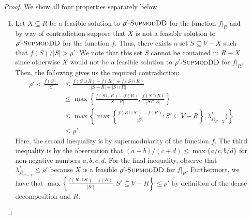 \documentclass{article}
\newcommand{\sdds}{\ensuremath{\textsc{SupmodDD}}\xspace}
\newcommand{\rhosdds}[1]{\ensuremath{#1\text{-}\sdds}}
\begin{document}
\begin{proof}
    We show all four properties separately below.
    \begin{enumerate}
        \item 
    Let $X \subseteq R$ be a feasible solution to \rhosdds{\rho'} for the function $f|_{R}$ and by way of contradiction suppose that $X$ is not a feasible solution to \rhosdds{\rho'} for the function $f$. Thus, there exists a set $S \subseteq V - X$ such that $f(S)/|S| > \rho'$. We note that this set $S$ cannot be contained in $R - X$ since otherwise $X$ would not be a feasible solution to \rhosdds{\rho'} for $f|_{R}$. Then, the following gives us the required contradiction:
    \begin{align*}
        \rho' < \frac{f(S)}{|S|}  & \leq \frac{f(S\cup R) - f(R) + f(S\cap R)}{|S - R| + |S\cap R|}\\
        & \leq \max\left\{\frac{f(S\cup R) - f(R)}{|S - R|}, \frac{f(S\cap R)}{|S\cap R|}\right\}\\
        &\leq \max\left\{\max\left\{\frac{f(R\cup S') - f(R)}{|S'|} : S'\subseteq V - R\right\}, 
        \lambda_{f|_{R - X}}^*
)\right\}\\
        & \leq \rho'.
    \end{align*}
    Here, the second inequality is by supermodularity of the function $f$. The third inequality is by the observation that $(a+b)/(c+d) \leq \max\{a/c, b/d\}$ for non-negative numbers $a,b,c,d$. For the final inequality, observe that 
    $\lambda_{f|_{R - X}}^* \leq \rho'$
    because $X$ is a feasible \rhosdds{\rho'} for $f|_{R}$. Furthermore, we have that $\max\left\{\frac{f(R\cup S') - f(R)}{|S'|} : S'\subseteq V - R\right\} \leq \rho'$ by definition of the dense decomposition and $R$.


\end{enumerate}
\end{proof}
\end{document}
